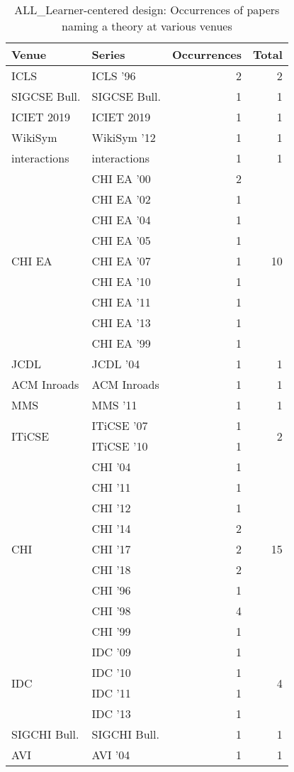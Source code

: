 \begin{table*}[t]
\begin{tabular}{llrr}
Venue & Series & Occurrences & Total\\\hline
\multirow{1}{*}{ICLS } & ICLS '96 & 2 & \multirow{1}{*}{2}\\
\multirow{1}{*}{SIGCSE Bull.} & SIGCSE Bull. & 1 & \multirow{1}{*}{1}\\
\multirow{1}{*}{ICIET 2019} & ICIET 2019 & 1 & \multirow{1}{*}{1}\\
\multirow{1}{*}{WikiSym } & WikiSym '12 & 1 & \multirow{1}{*}{1}\\
\multirow{1}{*}{interactions} & interactions & 1 & \multirow{1}{*}{1}\\
\multirow{9}{*}{CHI EA } & CHI EA '00 & 2 & \multirow{9}{*}{10}\\
& CHI EA '02 & 1 &\\
& CHI EA '04 & 1 &\\
& CHI EA '05 & 1 &\\
& CHI EA '07 & 1 &\\
& CHI EA '10 & 1 &\\
& CHI EA '11 & 1 &\\
& CHI EA '13 & 1 &\\
& CHI EA '99 & 1 &\\
\multirow{1}{*}{JCDL } & JCDL '04 & 1 & \multirow{1}{*}{1}\\
\multirow{1}{*}{ACM Inroads} & ACM Inroads & 1 & \multirow{1}{*}{1}\\
\multirow{1}{*}{MMS } & MMS '11 & 1 & \multirow{1}{*}{1}\\
\multirow{2}{*}{ITiCSE } & ITiCSE '07 & 1 & \multirow{2}{*}{2}\\
& ITiCSE '10 & 1 &\\
\multirow{9}{*}{CHI } & CHI '04 & 1 & \multirow{9}{*}{15}\\
& CHI '11 & 1 &\\
& CHI '12 & 1 &\\
& CHI '14 & 2 &\\
& CHI '17 & 2 &\\
& CHI '18 & 2 &\\
& CHI '96 & 1 &\\
& CHI '98 & 4 &\\
& CHI '99 & 1 &\\
\multirow{4}{*}{IDC } & IDC '09 & 1 & \multirow{4}{*}{4}\\
& IDC '10 & 1 &\\
& IDC '11 & 1 &\\
& IDC '13 & 1 &\\
\multirow{1}{*}{SIGCHI Bull.} & SIGCHI Bull. & 1 & \multirow{1}{*}{1}\\
\multirow{1}{*}{AVI } & AVI '04 & 1 & \multirow{1}{*}{1}\\
\end{tabular}
\caption{ALL\_Learner-centered design: Occurrences of papers naming a theory at various venues}
\end{table*}
